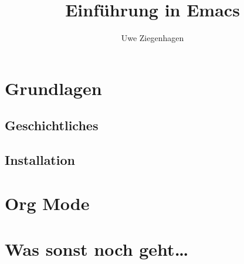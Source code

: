 \documentclass[12pt,ngerman]{scrbook}
\title{Einführung in Emacs}
\author{Uwe Ziegenhagen}
\begin{document}
\maketitle

\tableofcontents



\chapter{Grundlagen}

\section{Geschichtliches}

\section{Installation}


\chapter{Org Mode}

\chapter{Was sonst noch geht\ldots}
\end{document}
